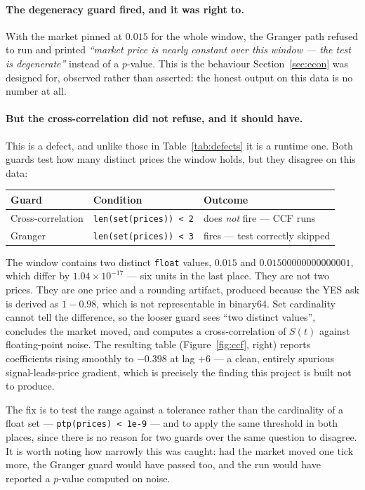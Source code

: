 \documentclass[11pt]{article}
\newcommand{\code}[1]{\texttt{\small #1}}
\begin{document}
\paragraph{The degeneracy guard fired, and it was right to.} With the market
pinned at $0.015$ for the whole window, the Granger path refused to run and
printed \emph{``market price is nearly constant over this window --- the test is
degenerate''} instead of a $p$-value. This is the behaviour
Section~\ref{sec:econ} was designed for, observed rather than asserted:
the honest output on this data is no number at all.

\paragraph{But the cross-correlation did not refuse, and it should have.} This is
a defect, and unlike those in Table~\ref{tab:defects} it is a runtime one. Both
guards test how many distinct prices the window holds, but they disagree on this
data:

\begin{center}
\small
\begin{tabular}{@{}lll@{}}
\toprule
Guard & Condition & Outcome \\
\midrule
Cross-correlation & \code{len(set(prices)) < 2} & does \emph{not} fire --- CCF runs \\
Granger           & \code{len(set(prices)) < 3} & fires --- test correctly skipped \\
\bottomrule
\end{tabular}
\end{center}

The window contains two distinct \code{float} values, $0.015$ and
$0.01500000000000001$, which differ by $1.04 \times 10^{-17}$ --- six units in
the last place. They are not two prices. They are one price and a rounding
artifact, produced because the YES ask is derived as $1 - 0.98$, which is not
representable in binary64. Set cardinality cannot tell the difference, so the
looser guard sees ``two distinct values'', concludes the market moved, and
computes a cross-correlation of $S(t)$ against floating-point noise. The
resulting table (Figure~\ref{fig:ccf}, right) reports coefficients rising
smoothly to $-0.398$ at lag $+6$ --- a clean, entirely spurious signal-leads-price
gradient, which is precisely the finding this project is built not to produce.

The fix is to test the range against a tolerance rather than the cardinality of a
float set --- \code{ptp(prices) < 1e-9} --- and to apply the same threshold in
both places, since there is no reason for two guards over the same question to
disagree. It is worth noting how narrowly this was caught: had the market moved
one tick more, the Granger guard would have passed too, and the run would have
reported a $p$-value computed on noise.
\end{document}
